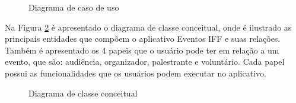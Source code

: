 \begin{figure}[H]
    \centering
    \caption{Diagrama de caso de uso}
    \label{fig:caso-de-uso}
\end{figure}


Na Figura \ref{fig:digrama-classe} é apresentado o diagrama de classe conceitual, onde é ilustrado as principais entidades que compõem o aplicativo Eventos IFF e suas relações. Também é apresentado os 4 papeis que o usuário pode ter em relação a um evento, que são: audiência, organizador, palestrante e voluntário. Cada papel possui as funcionalidades que os usuários podem executar no aplicativo.

\begin{figure}[H]
    \centering
    \caption{Diagrama de classe conceitual}
    \label{fig:digrama-classe}
\end{figure}

